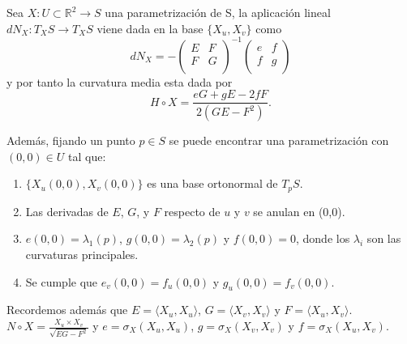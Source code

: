 	\begin{proposicion}
		Sea $X : U \subset \mathbb{R}^2 \to S$ una parametrización de S, la aplicación lineal $dN_X : T_X S \to T_X S$ viene dada en la base $\{X_u, X_v \}$ como
		\[
			dN_X = - \left( {\begin{array}{cc}
						E & F \\
						F & G \\
					\end{array} } \right)^{-1}
					\left( {\begin{array}{cc}
						e & f \\
						f & g \\
					\end{array} } \right)
		\]
		y por tanto la curvatura media esta dada por
		\[
			H \circ X = \frac{eG + gE -2fF}{2(GE-F^2)}.
		\]
		
		Además, fijando un punto $p \in S$ se puede encontrar una parametrización con $(0,0) \in U$ tal que:
		\begin{enumerate}
			\item $\{X_u(0,0), X_v(0,0) \}$ es una base ortonormal de $T_p S$.
			\item Las derivadas de $E$, $G$, y $F$ respecto de $u$ y $v$ se anulan en (0,0).
			\item $e(0,0) = \lambda_{1}(p)$, $g(0,0) = \lambda_{2}(p)$ y $f(0,0) = 0$, donde los $\lambda_i$ son las curvaturas principales.
			\item Se cumple que $e_v(0,0) = f_u(0,0)$ y $g_u(0,0) = f_v(0,0)$.
		\end{enumerate}
		
		Recordemos además que $E = \langle X_u, X_u \rangle$, $G = \langle X_v, X_v \rangle$ y $F = \langle X_u, X_v \rangle$. $N \circ X = \frac{X_u \times X_v}{\sqrt{EG-F^2}}$ y $e = \sigma_X(X_u, X_u)$, $g = \sigma_X(X_v, X_v)$ y $f = \sigma_X(X_u, X_v)$.
	\end{proposicion}
	${ }$
